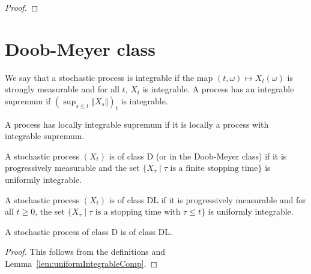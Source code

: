 \begin{proof}

\end{proof}



\section{Doob-Meyer class}

\begin{definition}\label{def:HasIntegrableSup}
  \leanok
We say that a stochastic process is integrable if the map $(t,\omega) \mapsto X_t(\omega)$ is strongly measurable and for all $t$, $X_t$ is integrable.
A process has an integrable supremum if $(\sup_{s \le t} \Vert X_s \Vert)_t$ is integrable.
\end{definition}


\begin{definition}\label{def:locallyIntegrableSup}
  \leanok
A process has locally integrable supremum if it is locally a process with integrable supremum.
\end{definition}


\begin{definition}\label{def:classD}
  \leanok
A stochastic process $(X_t)$ is of class D (or in the Doob-Meyer class) if it is progressively measurable and the set $\{X_\tau \mid \tau \text{ is a finite stopping time}\}$ is uniformly integrable.
\end{definition}


\begin{definition}[Class DL]\label{def:classDL}
  \leanok
A stochastic process $(X_t)$ is of class DL if it is progressively measurable and for all $t \ge 0$, the set $\{X_\tau \mid \tau \text{ is a stopping time with } \tau \le t\}$ is uniformly integrable.
\end{definition}

\begin{lemma}\label{lem:classDLOfClassD}
  \leanok
A stochastic process of class D is of class DL.
\end{lemma}

\begin{proof}
  \leanok
This follows from the definitions and Lemma~\ref{lem:uniformIntegrableComp}.
\end{proof}

